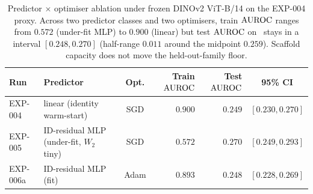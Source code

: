 \begin{table}[h]
\centering
\small
\setlength{\tabcolsep}{4pt}
\begin{tabular}{@{}llcrrc@{}}
\toprule
Run & Predictor & Opt. & Train $\mathrm{AUROC}$ & Test $\mathrm{AUROC}$ & 95\% CI \\
\midrule
EXP-004  & linear (identity warm-start)         & SGD  & $0.900$ & $0.249$ & $[0.230, 0.270]$ \\
EXP-005  & ID-residual MLP (under-fit, $W_{2}$ tiny) & SGD  & $0.572$ & $0.270$ & $[0.249, 0.293]$ \\
EXP-006a & ID-residual MLP (fit)                & Adam & $0.893$ & $0.248$ & $[0.228, 0.269]$ \\
\bottomrule
\end{tabular}
\caption{Predictor $\times$ optimiser ablation under frozen DINOv2
ViT-B/14 on the EXP-004 proxy. Across two predictor classes and two
optimisers, train $\mathrm{AUROC}$ ranges from $0.572$ (under-fit MLP) to
$0.900$ (linear) but test $\mathrm{AUROC}$ on \strongholdtwo\ stays in a
interval $[0.248, 0.270]$ (half-range $0.011$ around the midpoint
$0.259$). Scaffold capacity does not move the held-out-family floor.}
\label{tab:predictor-optimiser}
\end{table}
